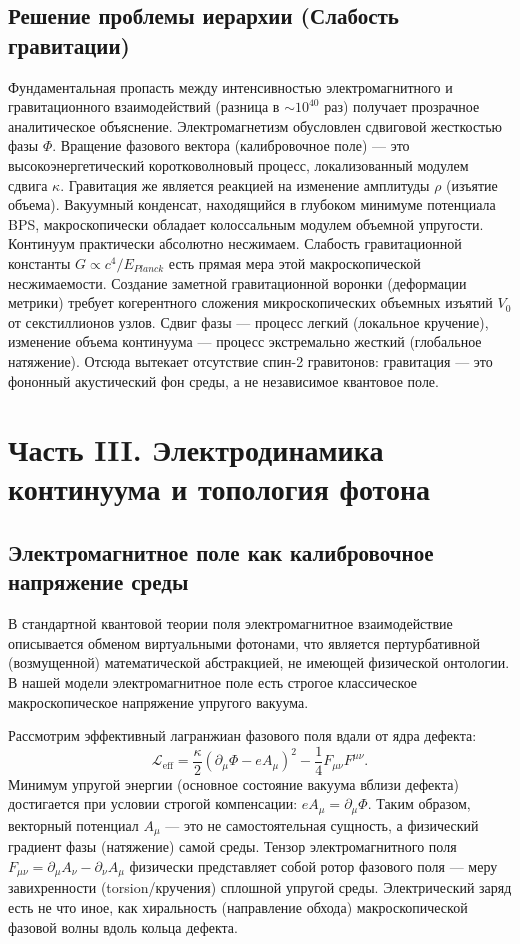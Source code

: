 \documentclass[12pt,a4paper]{article}
\begin{document}
\subsection{Решение проблемы иерархии (Слабость гравитации)}
Фундаментальная пропасть между интенсивностью электромагнитного и гравитационного взаимодействий (разница в $\sim 10^{40}$ раз) получает прозрачное аналитическое объяснение.
Электромагнетизм обусловлен сдвиговой жесткостью фазы $\Phi$. Вращение фазового вектора (калибровочное поле) — это высокоэнергетический коротковолновый процесс, локализованный модулем сдвига $\kappa$.
Гравитация же является реакцией на изменение амплитуды $\rho$ (изъятие объема). Вакуумный конденсат, находящийся в глубоком минимуме потенциала BPS, макроскопически обладает колоссальным модулем объемной упругости. Континуум практически абсолютно несжимаем.
Слабость гравитационной константы $G \propto c^4 / E_{Planck}$ есть прямая мера этой макроскопической несжимаемости. Создание заметной гравитационной воронки (деформации метрики) требует когерентного сложения микроскопических объемных изъятий $V_0$ от секстиллионов узлов. Сдвиг фазы — процесс легкий (локальное кручение), изменение объема континуума — процесс экстремально жесткий (глобальное натяжение). Отсюда вытекает отсутствие спин-2 гравитонов: гравитация — это фононный акустический фон среды, а не независимое квантовое поле.

\section{Часть III. Электродинамика континуума и топология фотона}

\subsection{Электромагнитное поле как калибровочное напряжение среды}
В стандартной квантовой теории поля электромагнитное взаимодействие описывается обменом виртуальными фотонами, что является пертурбативной (возмущенной) математической абстракцией, не имеющей физической онтологии. В нашей модели электромагнитное поле есть строгое классическое макроскопическое напряжение упругого вакуума.

Рассмотрим эффективный лагранжиан фазового поля вдали от ядра дефекта:
\begin{equation}
	\mathcal{L}_{\text{eff}} = \frac{\kappa}{2} (\partial_\mu \Phi - e A_\mu)^2 - \frac{1}{4} F_{\mu\nu} F^{\mu\nu}.
\end{equation}
Минимум упругой энергии (основное состояние вакуума вблизи дефекта) достигается при условии строгой компенсации: $e A_\mu = \partial_\mu \Phi$. Таким образом, векторный потенциал $A_\mu$ — это не самостоятельная сущность, а физический градиент фазы (натяжение) самой среды. Тензор электромагнитного поля $F_{\mu\nu} = \partial_\mu A_\nu - \partial_\nu A_\mu$ физически представляет собой ротор фазового поля — меру завихренности (torsion/кручения) сплошной упругой среды. Электрический заряд есть не что иное, как хиральность (направление обхода) макроскопической фазовой волны вдоль кольца дефекта.
\end{document}
